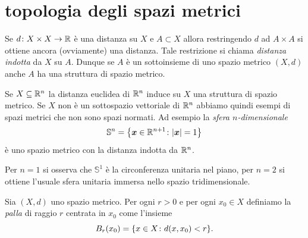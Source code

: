 \section{topologia degli spazi metrici}

\begin{definition}
Se $d\colon X\times X \to {\mathbb R}$ è una distanza su $X$
e $A \subset X$
allora restringendo $d$ ad $A \times A$ si ottiene ancora (ovviamente) una distanza.
Tale restrizione si chiama \emph{distanza indotta}
%
%
da $X$ su $A$.
Dunque se $A$ è un sottoinsieme di uno spazio metrico $(X,d)$ anche $A$ ha una struttura di spazio metrico.
\end{definition}

\begin{example}[sfera]
Se $X\subseteq {\mathbb R}^n$ la distanza euclidea di ${\mathbb R}^n$ induce
su $X$ una struttura di spazio metrico. Se $X$ non è un sottospazio vettoriale di ${\mathbb R}^n$ abbiamo quindi esempi di spazi metrici che non sono spazi normati. Ad esempio
la \emph{sfera $n$-dimensionale}%
%
\[
  \mathbb S^n = {\left\{ \boldsymbol x \in {\mathbb R}^{n+1}\colon {\left|\boldsymbol x\right|} = 1 \right\}}
\]
è uno spazio metrico con la distanza indotta da ${\mathbb R}^n$.

Per $n=1$ si osserva che $\mathbb S^1$ è la circonferenza unitaria nel piano, 
per $n=2$ si ottiene l'usuale sfera unitaria immersa nello spazio tridimensionale.
\end{example}

\begin{definition}[palla]%
\label{def:palla}%
\mymark{*}%
Sia $(X,d)$ uno spazio metrico.
Per ogni $r>0$ e per ogni $x_0\in X$
definiamo la \emph{palla}%
%
 di raggio $r$ centrata in
$x_0$ come l'insieme
\[
  B_r(x_0) = {\left\{ x\in X \colon d(x,x_0) < r \right\}}.
\]
\end{definition}

